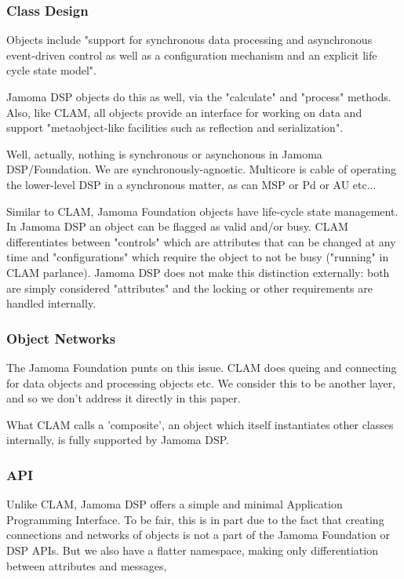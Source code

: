 \documentclass[twoside,10pt]{article}
\begin{document}
\subsubsection{Class Design}

Objects include "support for synchronous data processing and asynchronous event-driven control as well as a configuration mechanism and an explicit life cycle state model". 

Jamoma DSP objects do this as well, via the "calculate" and "process" methods.  Also, like CLAM, all objects provide an interface for working on data and support "metaobject-like facilities such as reflection and serialization".

Well, actually, nothing is synchronous or asynchonous in Jamoma DSP/Foundation.  We are synchronously-agnostic.  Multicore is cable of operating the lower-level DSP in a synchronous matter, as can MSP or Pd or AU etc...

Similar to CLAM, Jamoma Foundation objects have life-cycle state management.  In Jamoma DSP an object can be flagged as valid and/or busy.  CLAM differentiates between "controls" which are attributes that can be changed at any time and "configurations" which require the object to not be busy ("running" in CLAM parlance).  Jamoma DSP does not make this distinction externally: both are simply considered "attributes" and the locking or other requirements are handled internally. 



\subsubsection{Object Networks}

The Jamoma Foundation punts on this issue.  CLAM does queing and connecting for data objects and processing objects etc.  We consider this to be another layer, and so we don't address it directly in this paper.

What CLAM calls a 'composite', an object which itself instantiates other classes internally, is fully supported by Jamoma DSP.


\subsubsection{API}

Unlike CLAM, Jamoma DSP offers a simple and minimal Application Programming Interface.  To be fair, this is in part due to the fact that creating connections and networks of objects is not a part of the Jamoma Foundation or DSP APIs.  But we also have a flatter namespace, making only differentiation between attributes and messages,
\end{document}
